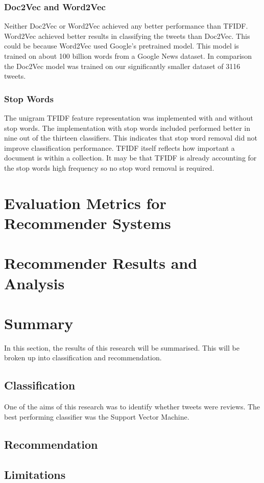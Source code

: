 \subsubsection*{Doc2Vec and Word2Vec}

Neither Doc2Vec or Word2Vec achieved any better performance than TFIDF. Word2Vec achieved better results in classifying the tweets than Doc2Vec. This could be because Word2Vec used Google's pretrained model. This model is trained on about 100 billion words from a Google News dataset. In comparison the Doc2Vec model was trained on our significantly smaller dataset of 3116 tweets.

\subsubsection*{Stop Words}

The unigram TFIDF feature representation was implemented with and without stop words. The implementation with stop words included performed better in nine out of the thirteen classifiers. This indicates that stop word removal did not improve classification performance. TFIDF itself reflects how important a document is within a collection. It may be that TFIDF is already accounting for the stop words high frequency so no stop word removal is required.

\section{Evaluation Metrics for Recommender Systems}

\section{Recommender Results and Analysis}

\section{Summary}

In this section, the results of this research will be summarised. This will be broken up into classification and recommendation.

\subsection*{Classification}

One of the aims of this research was to identify whether tweets were reviews. 
The best performing classifier was the Support Vector Machine.

\subsection*{Recommendation}

\subsection*{Limitations}

